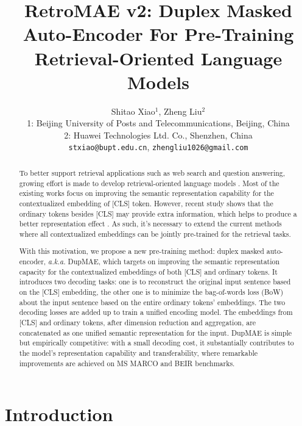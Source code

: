 \documentclass[11pt,a4paper]{article}
\title{RetroMAE v2: Duplex Masked Auto-Encoder For Pre-Training Retrieval-Oriented Language Models}
\author{Shitao Xiao$^1$, Zheng Liu$^2$ \\
  1: Beijing University of Posts and Telecommunications, Beijing, China \\ 
  2: Huawei Technologies Ltd. Co., Shenzhen, China \\
  \texttt{stxiao@bupt.edu.cn}, 
  \texttt{zhengliu1026@gmail.com}
}
\begin{document}
\maketitle 




\begin{abstract}
To better support retrieval applications such as web search and question answering, growing effort is made to develop retrieval-oriented language models \cite{gao2021condenser,wang2021tsdae,liu2022retromae}. 
Most of the existing works focus on improving the semantic representation capability for the contextualized embedding of [CLS] token. However, recent study shows that the ordinary tokens besides [CLS] may provide extra information, which helps to produce a better representation effect \cite{lin2022aggretriever}. As such, it's necessary to extend the current methods where all contextualized embeddings can be jointly pre-trained for the retrieval tasks. 



With this motivation, we propose a new pre-training method: duplex masked auto-encoder, \textit{a.k.a.} DupMAE, which targets on improving the semantic representation capacity for the contextualized embeddings of both [CLS] and ordinary tokens. It introduces two decoding tasks: one is to reconstruct the original input sentence based on the [CLS] embedding, the other one is to minimize the bag-of-words loss (BoW) about the input sentence based on the entire ordinary tokens' embeddings. The two decoding losses are added up to train a unified encoding model. The embeddings from [CLS] and ordinary tokens, after dimension reduction and aggregation, are concatenated as one unified semantic representation for the input. DupMAE is simple but empirically competitive: with a small decoding cost, it substantially contributes to the model's representation capability and transferability, where remarkable improvements are achieved on MS MARCO and BEIR benchmarks. 







\end{abstract} 

\section{Introduction}
\end{document}

